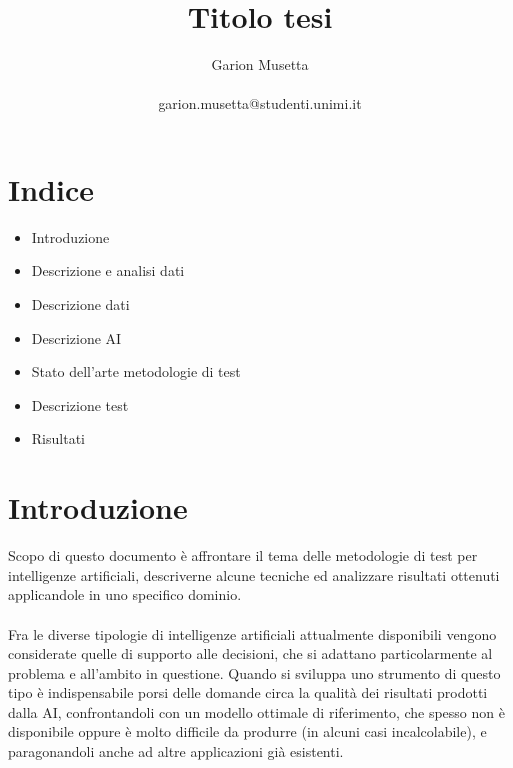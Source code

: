 \documentclass{article}
\title{\textbf{Titolo tesi}}
\author{Garion Musetta\\~\\garion.musetta@studenti.unimi.it}
\begin{document}
	\maketitle   
	 
	\section{Indice}
	\begin{itemize}
		\item Introduzione
		\item Descrizione e analisi dati
		\item Descrizione dati
		\item Descrizione AI
		\item Stato dell'arte metodologie di test
		\item Descrizione test
		\item Risultati
	\end{itemize}
	 
	 
	 
   	\section{Introduzione }
		Scopo di questo documento è affrontare il tema delle metodologie di test per intelligenze artificiali, descriverne alcune tecniche ed analizzare risultati ottenuti applicandole in uno specifico dominio.
		\\~\\
		Fra le diverse tipologie di intelligenze artificiali attualmente disponibili vengono considerate quelle di supporto alle decisioni, che si adattano particolarmente al problema e all'ambito in questione. Quando si sviluppa uno strumento di questo tipo è indispensabile porsi delle domande circa la qualità dei risultati prodotti dalla AI, confrontandoli con un modello ottimale di riferimento, che spesso non è disponibile oppure è molto difficile da produrre (in alcuni casi incalcolabile), e paragonandoli anche ad altre applicazioni già esistenti.
\end{document}
